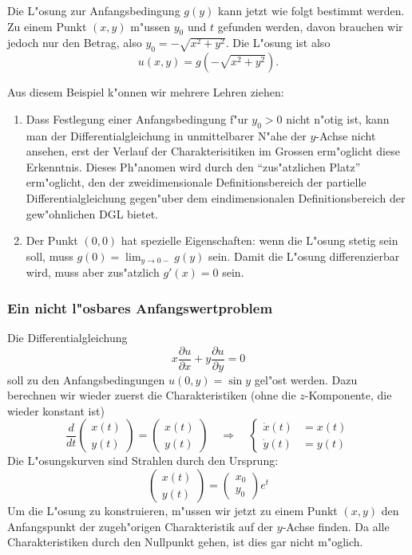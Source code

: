 Die L"osung zur Anfangsbedingung $g(y)$ kann jetzt wie folgt bestimmt werden.
Zu einem Punkt $(x,y)$ m"ussen $y_0$ und $t$ gefunden werden, davon brauchen wir
jedoch nur den Betrag, also $y_0=-\sqrt{x^2+y^2}$. Die L"osung ist also
\[
u(x,y)=g(-\sqrt{x^2+y^2}).
\]

Aus diesem Beispiel k"onnen wir mehrere Lehren ziehen: 
\begin{enumerate}
\item Dass Festlegung einer Anfangsbedingung f"ur $y_0>0$ nicht n"otig ist,
kann man der Differentialgleichung in unmittelbarer N"ahe der $y$-Achse nicht
ansehen, erst der Verlauf der Charakterisitiken im Grossen erm"oglicht
diese Erkenntnis. Dieses Ph"anomen wird durch den ``zus"atzlichen Platz''
erm"oglicht, den der zweidimensionale Definitionsbereich der partielle Differentialgleichung gegen"uber dem
eindimensionalen Definitionsbereich der gew"ohnlichen DGL bietet.
\item Der Punkt $(0,0)$ hat spezielle Eigenschaften: wenn die L"osung stetig
sein soll, muss $g(0)=\lim_{y\to 0-} g(y)$ sein. Damit die L"osung differenzierbar
wird, muss aber zus"atzlich $g'(x)=0$ sein.
\end{enumerate}

\subsubsection{Ein nicht l"osbares Anfangswertproblem\label{unloesbar}}
Die Differentialgleichung
\[
x\frac{\partial u}{\partial x}
+
y\frac{\partial u}{\partial y}
=0
\]
soll zu den Anfangsbedingungen $u(0,y)=\sin y$ gel"ost werden.
Dazu berechnen wir wieder zuerst die Charakteristiken (ohne die 
$z$-Komponente, die wieder konstant ist)
\[
\frac{d}{dt}
\begin{pmatrix}
x(t)\\y(t)
\end{pmatrix}
=
\begin{pmatrix}
x(t)\\y(t)
\end{pmatrix}
\quad
\Rightarrow
\quad
\left\{
\begin{aligned}
\dot x(t)&=x(t)\\
\dot y(t)&=y(t)
\end{aligned}
\right.
\]
Die L"osungskurven sind Strahlen durch den Ursprung:
\[
\begin{pmatrix}
x(t)\\y(t)
\end{pmatrix}
=\begin{pmatrix}x_0\\y_0\end{pmatrix}e^t
\]
Um die L"osung zu konstruieren, m"ussen wir jetzt zu einem Punkt
$(x,y)$ den Anfangspunkt der zugeh"origen Charakteristik auf der $y$-Achse
finden. Da alle Charakteristiken durch den Nullpunkt gehen, ist dies 
gar nicht m"oglich. 

